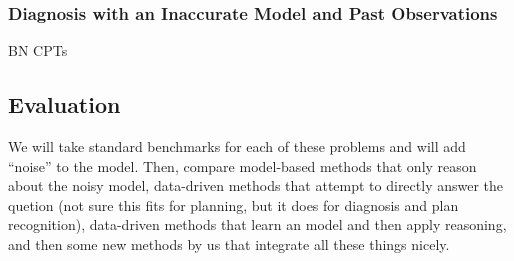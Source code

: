 \documentclass[12pt]{article}
\begin{document}

\subsubsection{Diagnosis with an Inaccurate Model and Past Observations}

BN 
CPTs










\subsection{Evaluation}

We will take standard benchmarks for each of these problems and will add ``noise'' to the model. Then, compare model-based methods that only reason about the noisy model, data-driven methods that attempt to directly answer the quetion (not sure this fits for planning, but it does for diagnosis and plan recognition), data-driven methods that learn an model and then apply reasoning, 
and then some new methods by us that integrate all these things nicely. 
\end{document}
